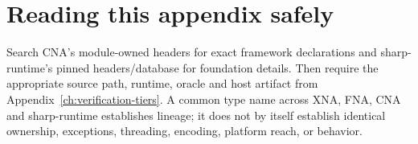 \section{Reading this appendix safely}

Search CNA's module-owned headers for exact framework declarations and sharp-runtime's pinned
headers/database for foundation details. Then require the appropriate source path, runtime,
oracle and host artifact from Appendix~\ref{ch:verification-tiers}. A common type name across
XNA, FNA, CNA and sharp-runtime establishes lineage; it does not by itself establish identical
ownership, exceptions, threading, encoding, platform reach, or behavior.
